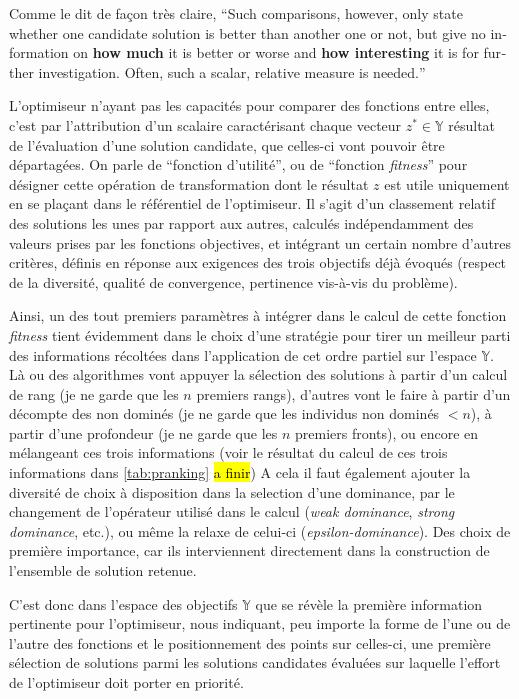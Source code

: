 Comme le dit de façon très claire,\textcite[94]{Weise2011} \foreignquote{english}{Such comparisons, however, only state whether one candidate solution is better than another one or not, but give no information on \textbf{how much} it is better or worse and \textbf{how interesting} it is for further investigation. Often, such a scalar, relative measure is needed.}

L'optimiseur n'ayant pas les capacités pour comparer des fonctions entre elles, c'est par l'attribution d'un scalaire caractérisant chaque vecteur $z^* \in \mathbb{Y}$ résultat de l'évaluation d'une solution candidate, que celles-ci vont pouvoir être départagées. On parle de \enquote{fonction d'utilité}, ou de \enquote{fonction \textit{fitness}} pour désigner cette opération de transformation dont le résultat $z$ est utile uniquement en se plaçant dans le référentiel de l'optimiseur. Il s'agit d'un classement relatif des solutions les unes par rapport aux autres, calculés indépendamment des valeurs prises par les fonctions objectives, et intégrant un certain nombre d'autres critères, définis en réponse aux exigences des trois objectifs déjà évoqués (respect de la diversité, qualité de convergence, pertinence vis-à-vis du problème). 

Ainsi, un des tout premiers paramètres à intégrer dans le calcul de cette fonction \textit{fitness} tient évidemment dans le choix d'une stratégie pour tirer un meilleur parti des informations récoltées dans l'application de cet ordre partiel sur l'espace $\mathbb{Y}$. Là ou des algorithmes vont appuyer la sélection des solutions à partir d'un calcul de rang (je ne garde que les $n$ premiers rangs), d'autres vont le faire à partir d'un décompte des non dominés (je ne garde que les individus non dominés $< n$), à partir d'une profondeur (je ne garde que les $n$ premiers fronts), ou encore en mélangeant ces trois informations (voir le résultat du calcul de ces trois informations dans \ref{tab:pranking} \hl{a finir}) A cela il faut également ajouter la diversité de choix à disposition dans la selection d'une dominance, par le changement de l'opérateur utilisé dans le calcul (\textit{weak dominance}, \textit{strong dominance}, etc.), ou même la relaxe de celui-ci (\textit{epsilon-dominance}). Des choix de première importance, car ils interviennent directement dans la construction de l'ensemble de solution retenue.

C'est donc dans l'espace des objectifs $\mathbb{Y}$ que se révèle la première information pertinente pour l'optimiseur, nous indiquant, peu importe la forme de l'une ou de l'autre des fonctions et le positionnement des points sur celles-ci, une première sélection de solutions parmi les solutions candidates évaluées sur laquelle l'effort de l'optimiseur doit porter en priorité.

